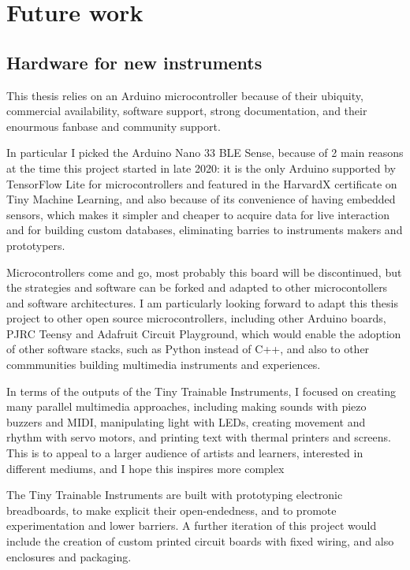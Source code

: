 \section{Future work}

\subsection{Hardware for new instruments}

This thesis relies on an Arduino microcontroller because of their ubiquity, commercial availability, software support, strong documentation, and their enourmous fanbase and community support.

In particular I picked the Arduino Nano 33 BLE Sense, because of 2 main reasons at the time this project started in late 2020: it is the only Arduino supported by TensorFlow Lite for microcontrollers and featured in the HarvardX certificate on Tiny Machine Learning, and also because of its convenience of having embedded sensors, which makes it simpler and cheaper to acquire data for live interaction and for building custom databases, eliminating barries to instruments makers and prototypers.

Microcontrollers come and go, most probably this board will be discontinued, but the strategies and software can be forked and adapted to other microcontollers and software architectures. I am particularly looking forward to adapt this thesis project to other open source microcontrollers, including other Arduino boards, PJRC Teensy and Adafruit Circuit Playground, which would enable the adoption of other software stacks, such as Python instead of C++, and also to other commmunities building multimedia instruments and experiences.

In terms of the outputs of the Tiny Trainable Instruments, I focused on creating many parallel multimedia approaches, including making sounds with piezo buzzers and MIDI, manipulating light with LEDs, creating movement and rhythm with servo motors, and printing text with thermal printers and screens. This is to appeal to a larger audience of artists and learners, interested in different mediums, and I hope this inspires more complex 

The Tiny Trainable Instruments are built with prototyping electronic breadboards, to make explicit their open-endedness, and to promote experimentation and lower barriers. A further iteration of this project would include the creation of custom printed circuit boards with fixed wiring, and also enclosures and packaging.

